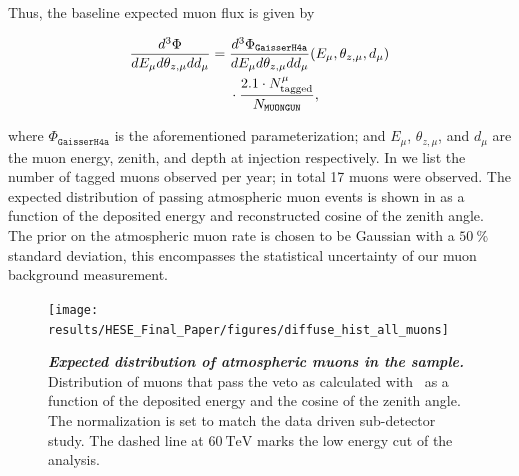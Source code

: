 Thus, the baseline expected muon flux is given by
\begin{linenomath*}
	\begin{equation}
	\begin{split}
	\frac{d^3\Phi}{d E_\mu d \theta_{z,\mu} d d_\mu} ={}& \frac{d^3\Phi_\texttt{GaisserH4a}}{d E_\mu d \theta_{z,\mu} d d_\mu}(E_\mu, \theta_{z,\mu},d_\mu)\\* & \cdot \frac{2.1 \cdot N^\mu_\textmd{tagged}}{N_{\texttt{MUONGUN}}},
	\end{split}
	\label{eq:muon_scaling}
	\end{equation}
\end{linenomath*}
where $\Phi_\texttt{GaisserH4a}$ is the aforementioned parameterization; and $E_\mu$, $\theta_{z,\mu}$, and $d_\mu$ are the muon energy, zenith, and depth at injection respectively.
In  we list the number of tagged muons observed per year; in total 17 muons were observed.
The expected distribution of passing atmospheric muon events is shown in  as a function of the deposited energy and reconstructed cosine of the zenith angle.
The prior on the atmospheric muon rate is chosen to be Gaussian with a $\SI{50}\percent$ standard deviation, this encompasses the statistical uncertainty of our muon background measurement.

\begin{figure}
	\centering
	\texttt{[image: results/HESE\_Final\_Paper/figures/diffuse\_hist\_all\_muons]}
	\internallinenumbers
	\caption{\textbf{\textit{Expected distribution of atmospheric muons in the sample.}} Distribution of muons that pass the veto as calculated with \MUONGUN~as a function of the deposited energy and the cosine of the zenith angle.
		The normalization is set to match the data driven sub-detector study.
		The dashed line at $\SI{60}\TeV$ marks the low energy cut of the analysis.}\label{fig:muons}
\end{figure}

